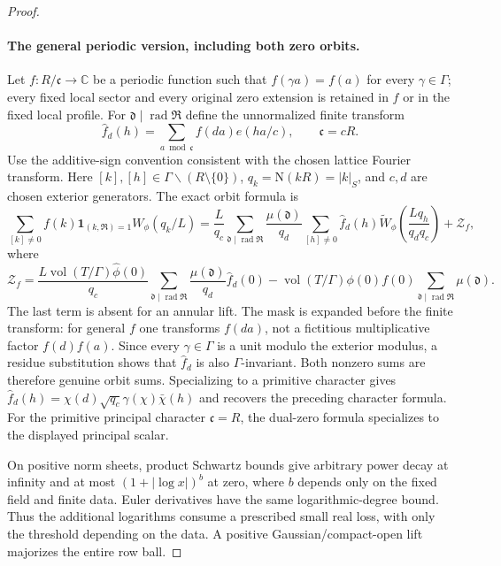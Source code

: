 \documentclass[11pt,a4paper]{article}
\theoremstyle{remark}\newtheorem{remark}[theorem]{Remark}
\newcommand{\N}{\mathrm N}
\newcommand{\one}{\mathbf 1}
\numberwithin{equation}{section}
\begin{document}
\begin{proof}
\paragraph{The general periodic version, including both zero orbits.}
Let $f:R/\mathfrak c\to\mathbb C$ be a periodic function such that
$f(\gamma a)=f(a)$ for every $\gamma\in\Gamma$; every fixed local
sector and every original zero extension is retained in $f$ or in
the fixed local profile. For $\mathfrak d\mid\operatorname{rad}\mathfrak R$
define the unnormalized finite transform
\[
 \widehat f_d(h)=\sum_{a\bmod\mathfrak c}
           f(da)e(ha/c),\qquad\mathfrak c=cR.
\]
Use the additive-sign convention consistent with the chosen lattice
Fourier transform. Here $[k],[h]\in\Gamma\backslash(R\setminus\{0\})$,
$q_k=\N(kR)=|k|_S$, and $c,d$ are chosen exterior generators.
The exact orbit formula is
\[
 \sum_{[k]\ne0}f(k)\one_{(k,\mathfrak R)=1}W_\phi(q_k/L)
 =\frac L{q_c}\sum_{\mathfrak d\mid\operatorname{rad}\mathfrak R}
       \frac{\mu(\mathfrak d)}{q_d}
       \sum_{[h]\ne0}\widehat f_d(h)
           \widetilde W_\phi\!\left(\frac{Lq_h}{q_dq_c}\right)
       +\mathcal Z_f,
\]
where
\[
 \mathcal Z_f=
 \frac{L\operatorname{vol}(T/\Gamma)\widehat\phi(0)}{q_c}
       \sum_{\mathfrak d\mid\operatorname{rad}\mathfrak R}
              \frac{\mu(\mathfrak d)}{q_d}\widehat f_d(0)
 -\operatorname{vol}(T/\Gamma)\phi(0)f(0)
       \sum_{\mathfrak d\mid\operatorname{rad}\mathfrak R}\mu(\mathfrak d).
\]
The last term is absent for an annular lift. The mask is expanded
before the finite transform: for general $f$ one transforms $f(da)$,
not a fictitious multiplicative factor $f(d)f(a)$. Since every
$\gamma\in\Gamma$ is a unit modulo the exterior modulus, a residue
substitution shows that $\widehat f_d$ is also $\Gamma$-invariant.
Both nonzero sums are therefore genuine orbit sums. Specializing to
a primitive character gives
$\widehat f_d(h)=\chi(d)\sqrt{q_c}\gamma(\chi)\bar\chi(h)$
and recovers the preceding character formula. For the primitive
principal character $\mathfrak c=R$, the dual-zero formula specializes
to the displayed principal scalar.


On positive norm sheets, product Schwartz bounds give arbitrary
power decay at infinity and at most $(1+|\log x|)^b$ at zero,
where $b$ depends only on the fixed field and finite data.
Euler derivatives have the same logarithmic-degree bound. Thus the
additional logarithms consume a prescribed small real loss, with only
the threshold depending on the data. A positive Gaussian/compact-open
lift majorizes the entire row ball.


\end{proof}
\end{document}
